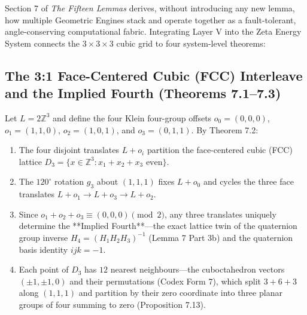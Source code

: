 \documentclass[11pt, a4paper]{article}
\begin{document}
Section 7 of \textit{The Fifteen Lemmas} derives, without introducing any new lemma, how multiple Geometric Engines stack and operate together as a fault-tolerant, angle-conserving computational fabric. Integrating Layer V into the Zeta Energy System connects the $3\times 3\times 3$ cubic grid to four system-level theorems:

\subsection{The 3:1 Face-Centered Cubic (FCC) Interleave and the Implied Fourth (Theorems 7.1--7.3)}
Let $L = 2\mathbb{Z}^3$ and define the four Klein four-group offsets $o_0 = (0,0,0)$, $o_1 = (1,1,0)$, $o_2 = (1,0,1)$, and $o_3 = (0,1,1)$. By Theorem 7.2:
\begin{enumerate}
    \item The four disjoint translates $L + o_i$ partition the face-centered cubic (FCC) lattice $D_3 = \{x \in \mathbb{Z}^3 : x_1 + x_2 + x_3 \text{ even}\}$.
    \item The $120^\circ$ rotation $g_3$ about $(1,1,1)$ fixes $L + o_0$ and cycles the three face translates $L+o_1 \to L+o_3 \to L+o_2$.
    \item Since $o_1 + o_2 + o_3 \equiv (0,0,0) \pmod 2$, any three translates uniquely determine the **Implied Fourth**—the exact lattice twin of the quaternion group inverse $H_4 = (H_1 H_2 H_3)^{-1}$ (Lemma 7 Part 3b) and the quaternion basis identity $ijk = -1$.
    \item Each point of $D_3$ has $12$ nearest neighbours—the cuboctahedron vectors $(\pm 1, \pm 1, 0)$ and their permutations (Codex Form 7), which split $3 + 6 + 3$ along $(1,1,1)$ and partition by their zero coordinate into three planar groups of four summing to zero (Proposition 7.13).
\end{enumerate}
\end{document}
